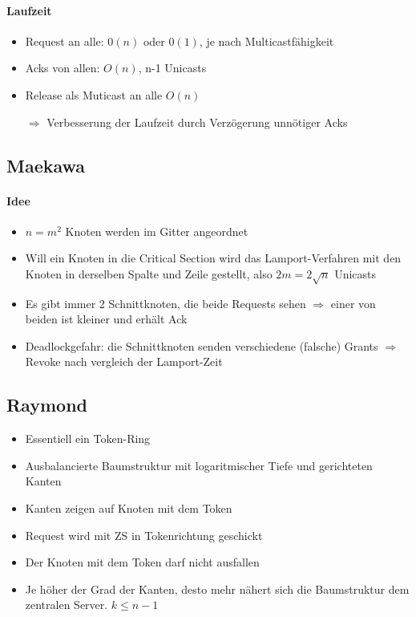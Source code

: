 \documentclass{scrartcl}
\begin{document}
\paragraph{Laufzeit}
\begin{itemize}
\item Request an alle: $0(n)$ oder $0(1)$, je nach Multicastfähigkeit
\item Acks von allen: $O(n)$, n-1 Unicasts
\item Release als Muticast an alle $O(n)$
\item[$\Rightarrow$] Verbesserung der Laufzeit durch Verzögerung unnötiger Acks
\end{itemize}



\subsection{Maekawa} \label{maek}
\paragraph{Idee} 
\begin{itemize}
\item $n = m^2$ Knoten werden im Gitter angeordnet
\item Will ein Knoten in die Critical Section wird das Lamport-Verfahren mit den Knoten in derselben Spalte und Zeile gestellt, also $2m = 2 \sqrt{n}$ Unicasts
\item Es gibt immer 2 Schnittknoten, die beide Requests sehen $\Rightarrow$ einer von beiden ist kleiner und erhält Ack
\item \Lightning Deadlockgefahr: die Schnittknoten senden verschiedene (falsche) Grants $\Rightarrow$ Revoke nach vergleich der Lamport-Zeit
\end{itemize}



\subsection{Raymond} \label{raym}

\begin{itemize}
\item Essentiell ein Token-Ring
\item Ausbalancierte Baumstruktur mit logaritmischer Tiefe und gerichteten Kanten
\item Kanten zeigen auf Knoten mit dem Token
\item Request wird mit ZS in Tokenrichtung geschickt
\item \Lightning Der Knoten mit dem Token darf nicht ausfallen 
\item Je höher der Grad der Kanten, desto mehr nähert sich die Baumstruktur dem zentralen Server. $k\leq n-1$
\end{itemize}
\end{document}
